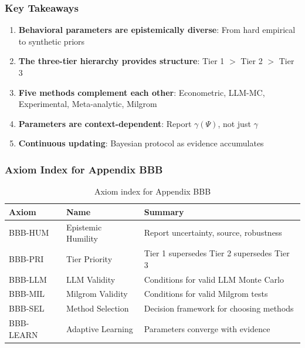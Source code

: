 \subsubsection{Key Takeaways}

\begin{enumerate}
    \item \textbf{Behavioral parameters are epistemically diverse}: From hard empirical to 
    synthetic priors
    \item \textbf{The three-tier hierarchy provides structure}: Tier 1 $>$ Tier 2 $>$ Tier 3
    \item \textbf{Five methods complement each other}: Econometric, LLM-MC, Experimental, 
    Meta-analytic, Milgrom
    \item \textbf{Parameters are context-dependent}: Report $\gamma(\Psi)$, not just $\gamma$
    \item \textbf{Continuous updating}: Bayesian protocol as evidence accumulates
\end{enumerate}

\subsubsection{Axiom Index for Appendix BBB}

\begin{table}[h]
\centering
\small
\begin{tabular}{lll}
\toprule
\textbf{Axiom} & \textbf{Name} & \textbf{Summary} \\
\midrule
BBB-HUM & Epistemic Humility & Report uncertainty, source, robustness \\
BBB-PRI & Tier Priority & Tier 1 supersedes Tier 2 supersedes Tier 3 \\
BBB-LLM & LLM Validity & Conditions for valid LLM Monte Carlo \\
BBB-MIL & Milgrom Validity & Conditions for valid Milgrom tests \\
BBB-SEL & Method Selection & Decision framework for choosing methods \\
BBB-LEARN & Adaptive Learning & Parameters converge with evidence \\
\bottomrule
\end{tabular}
\caption{Axiom index for Appendix BBB}
\label{tab:bbb-axioms}
\end{table}


